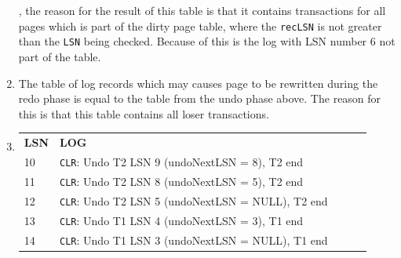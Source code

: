 \documentclass[10pt,a4paper]{article}
\begin{document}
\begin{enumerate}
	, the reason for the result of this table is that it contains transactions for all pages which is part of the dirty page table, where the \texttt{recLSN} is not greater than the \texttt{LSN} being checked. Because of this is the log with LSN number 6 not part of the table.
	\item The table of log records which may causes page to be rewritten during the redo phase is equal to the table from the undo phase above. The reason for this is that this table contains all loser transactions.
	\item 
	\begin{tabular}{l l l l l}
		\textbf{LSN} & \textbf{LOG} \\
		10 & \texttt{CLR}: Undo T2 LSN 9 (undoNextLSN = 8), T2 end \\
		11 & \texttt{CLR}: Undo T2 LSN 8 (undoNextLSN = 5), T2 end \\
		12 & \texttt{CLR}: Undo T2 LSN 5 (undoNextLSN = NULL), T2 end \\
		13 & \texttt{CLR}: Undo T1 LSN 4 (undoNextLSN = 3), T1 end \\
		14 & \texttt{CLR}: Undo T1 LSN 3 (undoNextLSN = NULL), T1 end \\
	\end{tabular}
\end{enumerate}
\end{document}
